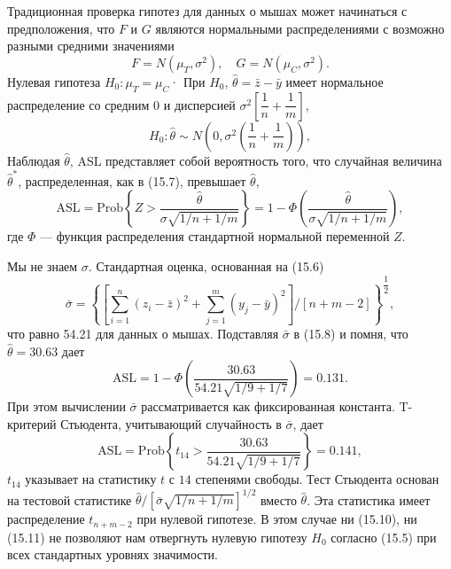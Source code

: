 Традиционная проверка гипотез для данных о мышах может начинаться с предположения, что $F$ и $G$ являются нормальными распределениями с возможно разными средними значениями
\begin{equation}
	F = N(\mu_T, \sigma^2), \quad G = N(\mu_C, \sigma^2).
\end{equation}
Нулевая гипотеза $H_0: \mu_T = \mu_C$· При $H_0$, $\hat{\theta} = \bar{z} - \bar{y}$ имеет нормальное распределение со средним 0 и дисперсией $\sigma^2 \left[ \dfrac{1}{n} + \dfrac{1}{m} \right]$,
\begin{equation}
	H_0: \hat{\theta} \sim N \left(0, \sigma^2 \left(\dfrac{1}{n} + \dfrac{1}{m}\right)\right),
\end{equation}
Наблюдая $\hat{\theta}$, ASL представляет собой вероятность того, что случайная величина $\hat{\theta}^*$, распределенная, как в (15.7), превышает $\hat{\theta}$,
\begin{equation}
	\text{ASL} = \text{Prob} \left\{ Z > \dfrac{\hat{\theta}}{\sigma \sqrt{1/n + 1/m} }\right\} = 1 - \Phi \left( \dfrac{\hat{\theta}}{\sigma \sqrt{1/n + 1/m}} \right),
\end{equation}
где $\Phi$ --- функция распределения стандартной нормальной переменной $Z$.

Мы не знаем $\sigma$. Стандартная оценка, основанная на (15.6)
\begin{equation}
	\bar{\sigma} = \left\{ \left[ \sum\limits_{i=1}^{n} (z_i - \bar{z})^2 + \sum\limits_{j=1}^{m} (y_j - \bar{y})^2 \right]/[n+m-2] \right\}^{\dfrac{1}{2}},
\end{equation}
что равно 54.21 для данных о мышах. Подставляя $\bar{\sigma}$ в (15.8) и помня, что $\hat{\theta} = 30.63$ дает
\begin{equation}
	\text{ASL} = 1 - \Phi\left(\dfrac{30.63}{54.21 \sqrt{1/9 + 1/7}}\right) = 0.131.
\end{equation}
При этом вычислении $\bar{\sigma}$ рассматривается как фиксированная константа. T-критерий Стьюдента, учитывающий случайность в $\bar{\sigma}$, дает
\begin{equation}
	\text{ASL} = \text{Prob} \left\{ t_{14} > \dfrac{30.63}{54.21 \sqrt{1/9 + 1/7}} \right\} = 0.141,
\end{equation}
$t_{14}$ указывает на статистику $t$ с $14$ степенями свободы. Тест Стьюдента основан на тестовой статистике $\hat{\theta}/[\bar{\sigma} \sqrt{1/n+1/m}]^{1/2}$ вместо $\hat{\theta}$. Эта статистика имеет распределение $t_{n+m-2}$ при нулевой гипотезе. В этом случае ни (15.10), ни (15.11) не позволяют нам отвергнуть нулевую гипотезу $H_0$ согласно (15.5) при всех стандартных уровнях значимости.

